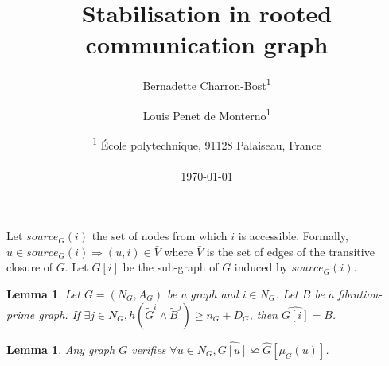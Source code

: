 \documentclass[11pt,letterpaper]{article}
\title{Stabilisation in rooted communication graph}
\author{Bernadette Charron-Bost\textsuperscript{1} \and Louis Penet de Monterno\textsuperscript{1}}
\date{\textsuperscript{1} \'Ecole polytechnique, 91128 Palaiseau, France\\~\\ \today}
\newtheorem{lem}[thm]{Lemma}
\begin{document}
\maketitle

Let $source_G(i)$ the set of nodes from which $i$ is accessible.
Formally, $u \in source_G(i) \Rightarrow (u,i) \in \bar V$ where $\bar V$ is the set of edges of the transitive closure of $G$.
Let $G[i]$ be the sub-graph of $G$ induced by $source_G(i)$.

\begin{lem} \label{lem:safB} 
	Let $G = (N_G, A_G)$ be a graph and $i \in N_G$.
	Let $B$ be a fibration-prime graph.
	If $\exists j \in N_G, h(\tilde{G}^i \wedge \tilde{B}^j) \geq n_G + D_G$, then $\widehat{G[i]} = B$.
\end{lem}

\begin{lem} \label{lem:commuthat} 
	Any graph $G$ verifies $\forall u \in N_G, \widehat{G[u]} \backsimeq \hat G[\mu_G(u)]$.
\end{lem}
\end{document}

